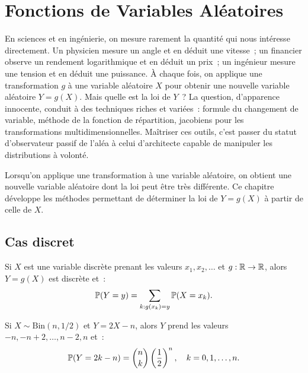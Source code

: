 \chapter{Fonctions de Variables Al\'eatoires}
\label{ch:fonctions_va}

En sciences et en ing\'enierie, on mesure rarement la quantit\'e qui nous int\'eresse directement. Un physicien mesure un angle et en d\'eduit une vitesse~; un financier observe un rendement logarithmique et en d\'eduit un prix~; un ing\'enieur mesure une tension et en d\'eduit une puissance. \`A chaque fois, on applique une transformation $g$ \`a une variable al\'eatoire $X$ pour obtenir une nouvelle variable al\'eatoire $Y = g(X)$. Mais quelle est la loi de $Y$~? La question, d'apparence innocente, conduit \`a des techniques riches et vari\'ees~: formule du changement de variable, m\'ethode de la fonction de r\'epartition, jacobiens pour les transformations multidimensionnelles. Ma\^itriser ces outils, c'est passer du statut d'observateur passif de l'al\'ea \`a celui d'architecte capable de manipuler les distributions \`a volont\'e.

\begin{intuition}
Lorsqu'on applique une transformation \`a une variable al\'eatoire, on obtient une
nouvelle variable al\'eatoire dont la loi peut \^etre tr\`es diff\'erente. Ce chapitre
d\'eveloppe les m\'ethodes permettant de d\'eterminer la loi de $Y = g(X)$ \`a partir
de celle de $X$.
\end{intuition}

\section{Cas discret}

\begin{proposition}
Si $X$ est une variable discr\`ete prenant les valeurs $x_1, x_2, \ldots$ et
$g : \mathbb{R} \to \mathbb{R}$, alors $Y = g(X)$ est discr\`ete et~:
\[
    \mathbb{P}(Y = y) = \sum_{k : g(x_k) = y} \mathbb{P}(X = x_k).
\]
\end{proposition}

\begin{exemple}
Si $X \sim \text{Bin}(n, 1/2)$ et $Y = 2X - n$, alors $Y$ prend les valeurs
$-n, -n+2, \ldots, n-2, n$ et~:
\[
    \mathbb{P}(Y = 2k-n) = \binom{n}{k} \left(\frac{1}{2}\right)^n, \quad k = 0, 1, \ldots, n.
\]
\end{exemple}

